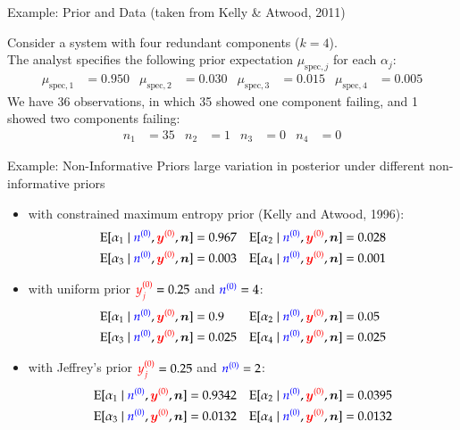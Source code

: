 \documentclass{beamer}
\def\rot#1{{\color{red}#1}}
\def\gruen#1{{\color{blue}#1}}
\def\byzr{\rot{\byz}}
\def\yzjr{\rot{y\uz_j}}
\def\nzg{\gruen{\nz}}
\begin{document}
\begin{frame}{Example: Prior and Data}
  (taken from Kelly \& Atwood, 2011) %

  \begin{example}
    Consider a system with four redundant components ($k=4$). \\
    The analyst specifies
    the following prior expectation $\mu_{\text{spec},j}$
    for each $\alpha_j$:
    \begin{align*}
      \mu_{\text{spec},1}&=0.950
      &
      \mu_{\text{spec},2}&=0.030
      &
      \mu_{\text{spec},3}&=0.015
      &
      \mu_{\text{spec},4}&=0.005
    \end{align*}
    We have 36 observations, in which 35 showed one component failing,
    and 1 showed two components failing:
    \begin{align*}
      n_1&=35
      &
      n_2&=1
      &
      n_3&=0
      &
      n_4&=0
    \end{align*}
  \end{example}
\end{frame}

\begin{frame}{Example: Non-Informative Priors}
  \alert{large variation in posterior under different non-informative priors} \\
  \begin{itemize}
  \item with constrained maximum entropy prior (Kelly and Atwood, 1996): %
    \begin{align*}
      \E[\alpha_1\mid\nzg,\byzr,\vec{n}]&=0.967
      &
      \E[\alpha_2\mid\nzg,\byzr,\vec{n}]&=0.028
      \\
      \E[\alpha_3\mid\nzg,\byzr,\vec{n}]&=0.003
      &
      \E[\alpha_4\mid\nzg,\byzr,\vec{n}]&=0.001
    \end{align*}
  \item 
  with uniform prior $\yzjr=0.25$ and $\nzg=4$:
  \begin{align*}
    \E[\alpha_1\mid\nzg,\byzr,\vec{n}]&=0.9
    &
    \E[\alpha_2\mid\nzg,\byzr,\vec{n}]&=0.05
    \\
    \E[\alpha_3\mid\nzg,\byzr,\vec{n}]&=0.025
    &
    \E[\alpha_4\mid\nzg,\byzr,\vec{n}]&=0.025
  \end{align*}
  \item
  with Jeffrey's prior $\yzjr=0.25$ and $\nzg=2$:
  \begin{align*}
    \E[\alpha_1\mid\nzg,\byzr,\vec{n}]&=0.9342
    &
    \E[\alpha_2\mid\nzg,\byzr,\vec{n}]&=0.0395
    \\
    \E[\alpha_3\mid\nzg,\byzr,\vec{n}]&=0.0132
    &
    \E[\alpha_4\mid\nzg,\byzr,\vec{n}]&=0.0132
  \end{align*}
  \end{itemize}
\end{frame}
\end{document}
